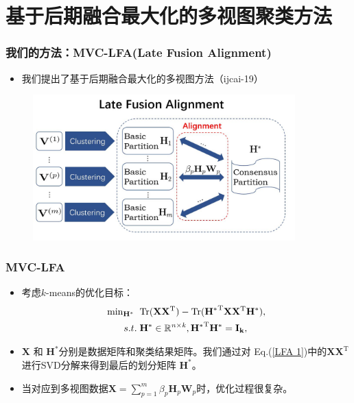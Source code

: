 \section{基于后期融合最大化的多视图聚类方法}


\begin{frame}
    \frametitle{我们的方法：MVC-LFA(Late Fusion Alignment)}
    \begin{itemize}
        \item 我们提出了基于后期融合最大化的多视图方法（ijcai-19）
    \end{itemize} 
    \begin{figure}
        \includegraphics[width=0.9\textwidth]{figures/model3.jpg} 
    \end{figure}          
\end{frame}

\begin{frame}
    \frametitle{MVC-LFA}
    \begin{itemize}
        \item 考虑$k$-means的优化目标：
\begin{equation}\label{LFA 1}
\begin{split}
\min\nolimits_{\mathbf{H}^*}\;&\;\mathrm{Tr}(\mathbf{X} \mathbf{X}^{\mathrm{ T }}) - \mathrm{Tr} ( {\mathbf{H}^*}^{\mathrm{ T }} \mathbf{X} \mathbf{X}^{\mathrm{ T }} \mathbf{H}^*),\\
s.t. &\;  \bf{H}^* \in \mathbb{R}^{\mathit{n}\times \mathit{k}}, {\mathbf{H}^*}^{ \mathrm{ T }}\mathbf{H}^* = \mathbf{I}_k,
\end{split}
\end{equation}
         \item $\mathbf{X}$ 和 $\mathbf{H}^*$分别是数据矩阵和聚类结果矩阵。我们通过对 Eq.(\ref{LFA 1})中的$\mathbf{X} \mathbf{X}^{\mathrm{ T }}$进行SVD分解来得到最后的划分矩阵 $\mathbf{H}^*$。
         \item  当对应到多视图数据$\mathbf{X}= \sum_{p=1}^m \beta_p \mathbf{H}_p \mathbf{W}_p$时，优化过程很复杂。
    \end{itemize}   
      
\end{frame}

